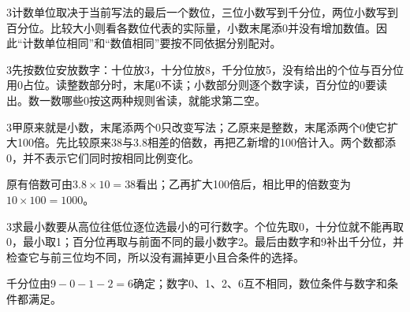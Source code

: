 \documentclass[multi=snippet,border={5bp 20bp 5bp 5bp}]{standalone}
\newenvironment{snippet}[3]{\begin{minipage}{#1bp}\color{answerred}\fontsize{#2}{#3}\selectfont\raggedright}{\end{minipage}}
\begin{document}
\begin{snippet}{505}{11.5}{14}\begin{multicols}{3}\raggedcolumns 计数单位取决于当前写法的最后一个数位，三位小数写到千分位，两位小数写到百分位。比较大小则看各数位代表的实际量，小数末尾添0并没有增加数值。因此“计数单位相同”和“数值相同”要按不同依据分别配对。\end{multicols}\end{snippet}
\begin{snippet}{505}{11.5}{14}\begin{multicols}{3}\raggedcolumns 先按数位安放数字：十位放3，十分位放8，千分位放5，没有给出的个位与百分位用0占位。读整数部分时，末尾0不读；小数部分则逐个数字读，百分位的0要读出。数一数哪些0按这两种规则省读，就能求第二空。\end{multicols}\end{snippet}
\begin{snippet}{505}{11.5}{14}\begin{multicols}{3}\raggedcolumns 甲原来就是小数，末尾添两个0只改变写法；乙原来是整数，末尾添两个0使它扩大100倍。先比较原来38与3.8相差的倍数，再把乙新增的100倍计入。两个数都添0，并不表示它们同时按相同比例变化。\par 原有倍数可由\(3.8\times10=38\)\allowbreak 看出；乙再扩大100倍后，相比甲的倍数变为\(10\times100=1000\)\allowbreak 。\end{multicols}\end{snippet}
\begin{snippet}{505}{11.5}{14}\begin{multicols}{3}\raggedcolumns 求最小数要从高位往低位逐位选最小的可行数字。个位先取0，十分位就不能再取0，最小取1；百分位再取与前面不同的最小数字2。最后由数字和9补出千分位，并检查它与前三位均不同，所以没有漏掉更小且合条件的选择。\par 千分位由\(9-0-1-2=6\)\allowbreak 确定；数字0、1、2、6互不相同，数位条件与数字和条件都满足。\end{multicols}\end{snippet}
\end{document}

